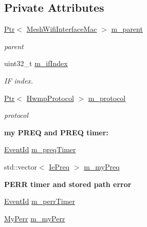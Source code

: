 \subsection*{Private Attributes}
\begin{DoxyCompactItemize}
\item 
\hyperlink{classns3_1_1Ptr}{Ptr}$<$ \hyperlink{classns3_1_1MeshWifiInterfaceMac}{Mesh\+Wifi\+Interface\+Mac} $>$ \hyperlink{classns3_1_1dot11s_1_1HwmpProtocolMac_accb34aacf86b332bd47c5492f1a0165c}{m\+\_\+parent}
\begin{DoxyCompactList}\small\item\em parent \end{DoxyCompactList}\item 
uint32\+\_\+t \hyperlink{classns3_1_1dot11s_1_1HwmpProtocolMac_a5cd979f58026374858b08a4f7ca00ec1}{m\+\_\+if\+Index}
\begin{DoxyCompactList}\small\item\em IF index. \end{DoxyCompactList}\item 
\hyperlink{classns3_1_1Ptr}{Ptr}$<$ \hyperlink{classns3_1_1dot11s_1_1HwmpProtocol}{Hwmp\+Protocol} $>$ \hyperlink{classns3_1_1dot11s_1_1HwmpProtocolMac_a6a05e798e264c97e2b5c484a29270b7d}{m\+\_\+protocol}
\begin{DoxyCompactList}\small\item\em protocol \end{DoxyCompactList}\end{DoxyCompactItemize}
\begin{Indent}{\bf my P\+R\+EQ and P\+R\+EQ timer\+:}\par
\begin{DoxyCompactItemize}
\item 
\hyperlink{classns3_1_1EventId}{Event\+Id} \hyperlink{classns3_1_1dot11s_1_1HwmpProtocolMac_a8cdeebe6f35b7b3373c8ca9dd4c3c0cf}{m\+\_\+preq\+Timer}
\item 
std\+::vector$<$ \hyperlink{classns3_1_1dot11s_1_1IePreq}{Ie\+Preq} $>$ \hyperlink{classns3_1_1dot11s_1_1HwmpProtocolMac_ab89814e2268f60ccf49c06423757b821}{m\+\_\+my\+Preq}
\end{DoxyCompactItemize}
\end{Indent}
\begin{Indent}{\bf P\+E\+RR timer and stored path error}\par
\begin{DoxyCompactItemize}
\item 
\hyperlink{classns3_1_1EventId}{Event\+Id} \hyperlink{classns3_1_1dot11s_1_1HwmpProtocolMac_aac737fed7d5760666c57ee87d041f0e4}{m\+\_\+perr\+Timer}
\item 
\hyperlink{structns3_1_1dot11s_1_1HwmpProtocolMac_1_1MyPerr}{My\+Perr} \hyperlink{classns3_1_1dot11s_1_1HwmpProtocolMac_a5b736c13ed78e292ee147e4151b96171}{m\+\_\+my\+Perr}
\end{DoxyCompactItemize}
\end{Indent}
